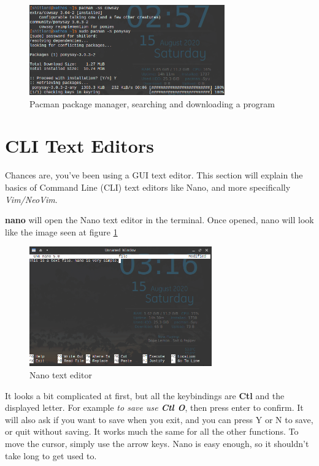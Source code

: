 \documentclass[12pt, letterpaper, twoside]{article}
\begin{document}
\begin{figure} [ht]
	\centering
	\includegraphics[width=0.75\textwidth]{pacman}
	\caption{Pacman package manager, searching and downloading a program}
\end{figure}

\newpage
\section{CLI Text Editors}

Chances are, you've been using a GUI text editor. This section will explain the basics of Command Line (CLI) text editors like Nano, and more specifically \textit{Vim/NeoVim}.

\textbf{nano} will open the Nano text editor in the terminal. Once opened, nano will look like the image seen at figure \ref{figure:nano}

\begin{figure} [ht]
	\centering
	\includegraphics[width=0.70\textwidth]{nano}
	\caption{Nano text editor}
	\label{figure:nano}
\end{figure}

It looks a bit complicated at first, but all the keybindings are \textbf{Ctl} and the displayed letter. For example \textit{to save use \textbf{Ctl O}}, then press enter to confirm. It will also ask if you want to save when you exit, and you can press Y or N to save, or quit without saving. It works much the same for all the other functions. To move the cursor, simply use the arrow keys. Nano is easy enough, so it shouldn't take long to get used to.
\end{document}
